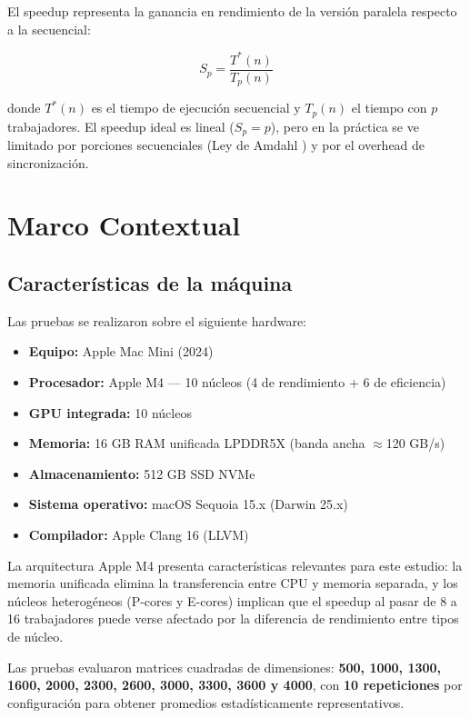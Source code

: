 \documentclass{article}
\begin{document}
El speedup representa la ganancia en rendimiento de la versión paralela respecto a la secuencial:

\[ S_p = \frac{T^*(n)}{T_p(n)} \]

donde $T^*(n)$ es el tiempo de ejecución secuencial y $T_p(n)$ el tiempo con $p$ trabajadores. El speedup ideal es lineal ($S_p = p$), pero en la práctica se ve limitado por porciones secuenciales (Ley de Amdahl \cite{amdahl}) y por el overhead de sincronización.

\section{Marco Contextual}

\subsection{Características de la máquina}

Las pruebas se realizaron sobre el siguiente hardware:

\begin{itemize}
    \item \textbf{Equipo:} Apple Mac Mini (2024)
    \item \textbf{Procesador:} Apple M4 --- 10 núcleos (4 de rendimiento + 6 de eficiencia)
    \item \textbf{GPU integrada:} 10 núcleos
    \item \textbf{Memoria:} 16 GB RAM unificada LPDDR5X (banda ancha $\approx$120 GB/s) \cite{apple_m4}
    \item \textbf{Almacenamiento:} 512 GB SSD NVMe
    \item \textbf{Sistema operativo:} macOS Sequoia 15.x (Darwin 25.x)
    \item \textbf{Compilador:} Apple Clang 16 (LLVM)
\end{itemize}

La arquitectura Apple M4 presenta características relevantes para este estudio: la memoria unificada elimina la transferencia entre CPU y memoria separada, y los núcleos heterogéneos (P-cores y E-cores) implican que el speedup al pasar de 8 a 16 trabajadores puede verse afectado por la diferencia de rendimiento entre tipos de núcleo.

Las pruebas evaluaron matrices cuadradas de dimensiones: \textbf{500, 1000, 1300, 1600, 2000, 2300, 2600, 3000, 3300, 3600 y 4000}, con \textbf{10 repeticiones} por configuración para obtener promedios estadísticamente representativos.
\end{document}
